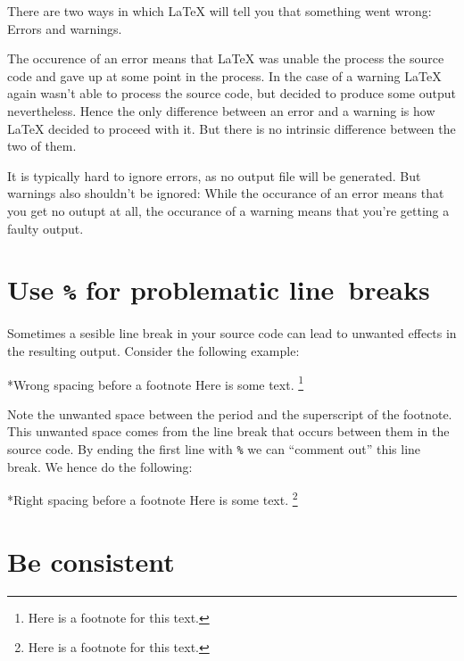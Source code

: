 There are two ways in which {\LaTeX} will tell you that something went wrong:
Errors and warnings.

The occurence of an error means that {\LaTeX} was unable the process the source code and gave up at some point in the process.
In the case of a warning {\LaTeX} again wasn’t able to process the source code, but decided to produce some output nevertheless.
Hence the only difference between an error and a warning is how {\LaTeX} decided to proceed with it.
But there is no intrinsic difference between the two of them.

It is typically hard to ignore errors, as no output file will be generated.
But warnings also shouldn’t be ignored:
While the occurance of an error means that you get no outupt at all, the occurance of a warning means that you’re getting a faulty output.






\section{Use \texttt{\%} for problematic line~breaks}

Sometimes a sesible line break in your source code can lead to unwanted effects in the resulting output.
Consider the following example:
\begin{showlatex}*{Wrong spacing before a footnote}
Here is some text.
\footnote{Here is a footnote for this text.}
\end{showlatex}
Note the unwanted space between the period and the superscript of the footnote.
This unwanted space comes from the line break that occurs between them in the source code.
By ending the first line with \texttt{\%} we can \enquote{comment out} this line break.
We hence do the following:
\begin{showlatex}*{Right spacing before a footnote}
Here is some text.%
\footnote{Here is a footnote for this text.}
\end{showlatex}





\section{Be consistent}

